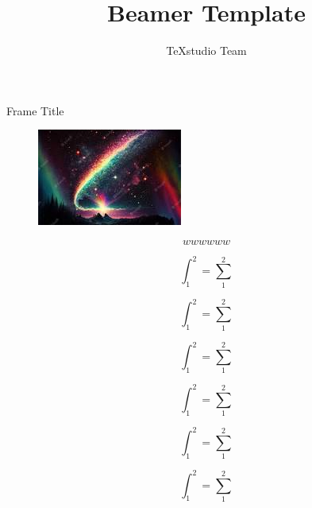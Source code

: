 \usepackage{listings}
\usepackage{amsthm}
\usepackage[]{amsmath}
\title{Beamer Template}
\author{TeXstudio Team}

\begin{frame}[plain]
	\maketitle
\end{frame}
\begin{frame}{Frame Title}
	\begin{figure}
		\centering
		\includegraphics[width=0.7\linewidth]{screenshot001}
		\caption{}
		\label{fig:screenshot001}
	\end{figure}
	\begin{equation}
		wwwwww
		\label{www}
	\end{equation}
\end{frame}


\begin{frame}
	\begin{equation}\label{key}
		\int_{1}^{2}=\sum_{1}^{2}
	\end{equation}
\end{frame}
\begin{frame}
	\begin{equation}\label{key}
		\int_{1}^{2}=\sum_{1}^{2}
	\end{equation}
\end{frame}
\begin{frame}
	\begin{equation}\label{key}
		\int_{1}^{2}=\sum_{1}^{2}
	\end{equation}
\end{frame}
\begin{frame}
	\begin{equation}\label{key}
		\int_{1}^{2}=\sum_{1}^{2}
	\end{equation}
\end{frame}
\begin{frame}
	\begin{equation}\label{key}
		\int_{1}^{2}=\sum_{1}^{2}
	\end{equation}
\end{frame}
\begin{frame}
	\begin{equation}\label{key}
		\int_{1}^{2}=\sum_{1}^{2}
	\end{equation}
\end{frame}

